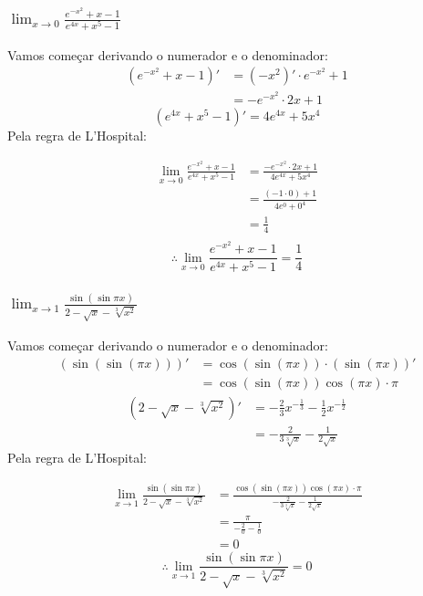 \documentclass[12pt]{article}
\theoremstyle{definition}
\begin{document}
\subsubsection{\(\lim_{x\rightarrow 0} \frac{e^{-x^2}+x-1}{e^{4x}+x^5-1}\)}
Vamos começar derivando o numerador e o denominador:
\begin{align*}
    (e^{-x^2}+x-1)'
    &= (-x^2)' \cdot e^{-x^2} + 1 \\
    &= - e^{-x^2}\cdot 2x + 1
\end{align*}
\[
    (e^{4x}+x^5-1)' = 4 e^{4x} + 5x^4
\]
Pela regra de L'Hospital:

\begin{align*}
    \lim_{x\rightarrow 0} \frac{e^{-x^2}+x-1}{e^{4x}+x^5-1}
    &= \frac{- e^{-x^2}\cdot 2x + 1}{4 e^{4x} + 5x^4} \\
    &= \frac{(- 1\cdot 0) + 1}{4 e^{0} + 0^4} \\
    &= \frac{1}{4} \\
\end{align*}
\[
    \boxed{
        \therefore \lim_{x\rightarrow 0} \frac{e^{-x^2}+x-1}{e^{4x}+x^5-1} = \frac{1}{4}
    }
\]

\subsubsection{\(\lim_{x\rightarrow 1} \frac{\sin{(\sin{\pi x})}}{2-\sqrt{x}-\sqrt[3]{x^2}}\)}
Vamos começar derivando o numerador e o denominador:
\begin{align*}
    (\sin{(\sin{(\pi x)})})'
    &= \cos{(\sin{(\pi x)})} \cdot (\sin{(\pi x)})' \\
    &= \cos{(\sin{(\pi x)})}\cos{(\pi x)} \cdot \pi
\end{align*}
\begin{align*}
    (2-\sqrt{x}-\sqrt[3]{x^2})'
    &= -\frac{2}{3}x^{-\frac{1}{3}}-\frac{1}{2}x^{-\frac{1}{2}} \\
    &= -\frac{2}{3\sqrt[3]{x}} - \frac{1}{2\sqrt{x}}
\end{align*}
Pela regra de L'Hospital:

\begin{align*}
    \lim_{x\rightarrow 1} \frac{\sin{(\sin{\pi x})}}{2-\sqrt{x}-\sqrt[3]{x^2}}
    &= \frac{\cos{(\sin{(\pi x)})}\cos{(\pi x)} \cdot \pi}{-\frac{2}{3\sqrt[3]{x}} - \frac{1}{2\sqrt{x}}} \\
    &= \frac{\pi}{-\frac{2}{0} - \frac{1}{0}} \\
    &= 0
\end{align*}
\[
    \boxed{
        \therefore \lim_{x\rightarrow 1} \frac{\sin{(\sin{\pi x})}}{2-\sqrt{x}-\sqrt[3]{x^2}} = 0
    }
\]
\end{document}

